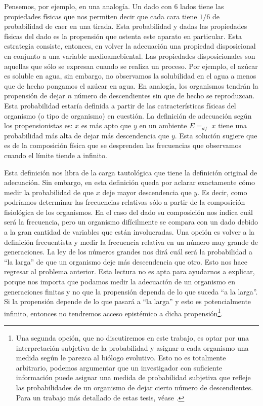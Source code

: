 Pensemos, por ejemplo, en una analogía. Un dado con 6 lados tiene las propiedades físicas que nos permiten decir que cada cara tiene $1/6$  de probabilidad de caer en una tirada. Esta probabilidad y dadas las propiedades físicas del dado es la propensión que ostenta este aparato en particular. Esta estrategia consiste, entonces, en volver la adecuación una propiedad disposicional en conjunto a una variable medioamebiental. Las propiedades disposicionales son aquellas que sólo se expresan cuando se realiza un proceso. Por ejemplo, el azúcar es soluble en agua, sin embargo, no observamos la solubilidad en el agua a menos que de hecho pongamos el azúcar en agua. En analogía, los organismos tendrán la propensión de dejar $n$ número de descendientes sin que de hecho se reproduzcan. Esta probabilidad estaría definida a partir de las catracterísticas físicas del organismo (o tipo de organismo) en cuestión. La definición de adecuación según los propensionistas es: $x$ es más apto que $y$ en un ambiente $E =_{df}$ $x$ tiene una probabilidad más alta de dejar más descendencia que $y$. Esta solución sugiere que es de la composición física que se desprenden las frecuencias que observamos cuando el límite tiende a infinito.

Esta definición nos libra de la carga tautológica que tiene la definición original de adecuación. Sin embargo, en esta definición queda por aclarar exactamente cómo medir la probabilidad de que $x$ deje mayor descendencia que $y$. Es decir, como podríamos determinar las frecuencias relativas sólo a partir de la composición fisiológica de los organismos. En el caso del dado su composición nos indica cuál será la frecuencia, pero un organismo difícilmente se compara con un dado debido a la gran cantidad de variables que están involucradas. Una opción es volver a la definición frecuentista y medir la frecuencia relativa en un número muy grande de generaciones. La ley de los números grandes nos dirá cuál será la probabilidad a ``la larga'' de que un organismo deje más descendencia que otro. Esto nos hace regresar al problema anterior. Esta lectura no es apta para ayudarnos a explicar, porque nos importa que podamos medir la adecuación de un organismo en generaciones finitas y no que la propensión dependa de lo que suceda ``a la larga''. Si la propensión depende de lo que pasará a ``la larga'' y esto es potencialmente infinito, entonces no tendremos acceso epistémico a dicha propensión\footnote{Una segunda opción, que no discutiremos en este trabajo, es optar por una interpretación subjetiva de la probabilidad y asignar a cada organismo una medida según le parezca al biólogo evolutivo. Esto no es totalmente arbitrario, podemos argumentar que un investigador con suficiente información puede asignar una medida de probabilidad subjetiva que refleje las probabilidades de un organismo de dejar cierto número de descendientes. Para un trabajo más detallado de estas tesis, véase \cite{Suarez2021}.}.

